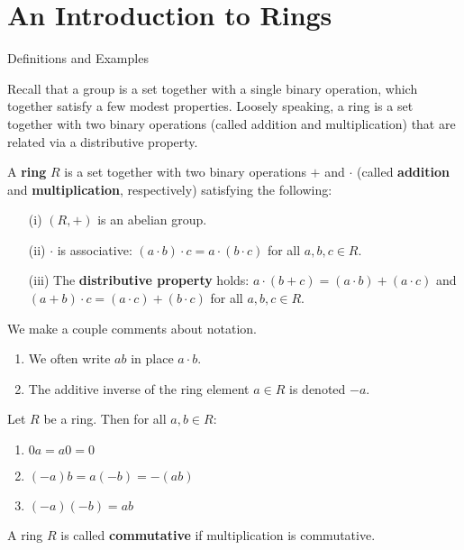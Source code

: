 \chapter{An Introduction to Rings}
\label{chapter:rings}
\thispagestyle{empty}

\begin{section}{Definitions and Examples}

Recall that a group is a set together with a single binary operation, which together satisfy a few modest properties. Loosely speaking, a ring is a set together with two binary operations (called addition and multiplication) that are related via a distributive property.

\begin{definition}
A \textbf{ring} $R$ is a set together with two binary operations $+$ and $\cdot$ (called \textbf{addition} and \textbf{multiplication}, respectively) satisfying the following:
\begin{enumerate}
\item[(i)] $(R,+)$ is an abelian group.
\item[(ii)] $\cdot$ is associative: $(a\cdot b)\cdot c=a\cdot (b\cdot c)$ for all $a,b,c\in R$.
\item[(iii)] The \textbf{distributive property} holds: $a\cdot (b+c)=(a\cdot b)+(a\cdot c)$ and $(a+b)\cdot c = (a\cdot c)+(b\cdot c)$ for all $a,b,c\in R$.
\end{enumerate}
\end{definition}

\begin{remark}
We make a couple comments about notation.
\begin{enumerate}[label=\rm{(\alph*)}]
\item We often write $ab$ in place $a\cdot b$.
\item The additive inverse of the ring element $a\in R$ is denoted $-a$.
\end{enumerate}
\end{remark}

\begin{theorem}
Let $R$ be a ring.  Then for all $a,b\in R$:
\begin{enumerate}
\item $0a=a0=0$
\item $(-a)b=a(-b)=-(ab)$
\item $(-a)(-b)=ab$
\end{enumerate}
\end{theorem}

\begin{definition}
A ring $R$ is called \textbf{commutative} if multiplication is commutative.
\end{definition}


\end{section}
